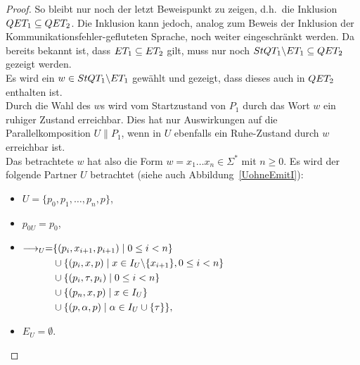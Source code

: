 \begin{proof}
  So bleibt nur noch der letzt Beweispunkt zu zeigen, d.h.\ die Inklusion $QET
  _1\subseteq QET _2$. Die Inklusion kann jedoch, analog zum Beweis der
  Inklusion der Kommunikationsfehler-gefluteten Sprache, noch weiter
  eingeschränkt werden. Da bereits bekannt ist, dass $ET _1\subseteq ET _2$
  gilt, muss nur noch $StQT _1\backslash ET _1\subseteq QET _2$ gezeigt
  werden.\\
  Es wird ein $w\in StQT _1\backslash ET _1$ gewählt und gezeigt, dass dieses
  auch in $QET _2$ enthalten ist.\\
  Durch die Wahl des $w$s wird vom Startzustand von $P_1$ durch das Wort $w$
  ein ruhiger Zustand erreichbar. Dies hat nur Auswirkungen auf die
  Parallelkomposition $U\|P_1$, wenn in $U$ ebenfalls ein Ruhe-Zustand durch
  $w$ erreichbar ist.\\
  Das betrachtete $w$ hat also die Form $w=x_1\dots x_n\in\Sigma ^*$ mit $n\geq
  0$. Es wird der folgende Partner $U$ betrachtet (siehe auch
  Abbildung~\ref{UohneEmitI}):
  \begin{itemize}
    \item $U=\{p_0,p_1,\dots ,p_n, p\}$,
    \item $p_{0U}=p_0$,
    \item $\begin{aligned}[t]
        \must _U=&\{(p_i,x_{i+1},p_{i+1})\mid  0\leq i< n\}\\
        &\cup\{(p_i,x,p)\mid  x\in I_U\backslash\{x_{i+1}\}, 0\leq i< n\}\\
        &\cup\{(p_i,\tau,p_i)\mid 0\leq i< n\}\\
        &\cup\{(p_n,x,p)\mid x\in I_U\}\\
        &\cup\{(p,\alpha,p)\mid \alpha\in I_U\cup\{\tau\}\},
    \end{aligned}$
    \item $E_U=\emptyset$.
  \end{itemize}
  \begin{figure} [h!tbp]
  \begin{center}
\end{center}
\end{figure}
\end{proof}
